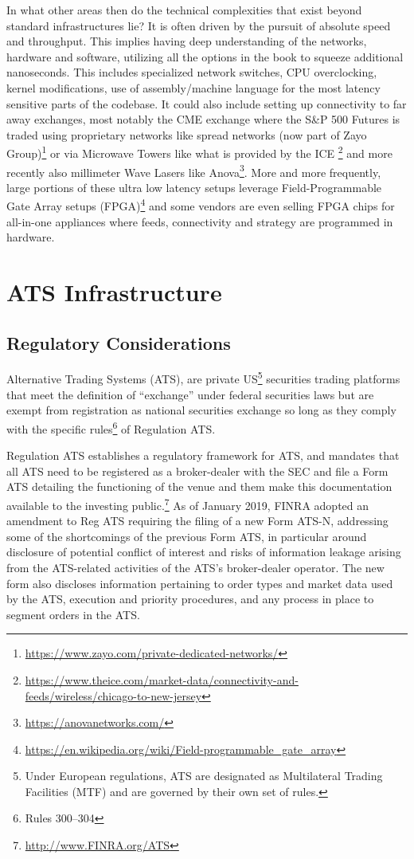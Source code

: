 In what other areas then do the technical complexities that exist beyond standard infrastructures lie? It is often driven by the pursuit of absolute speed and throughput. This implies having deep understanding of the networks, hardware and software, utilizing all the options in the book to squeeze additional nanoseconds. This includes specialized network switches, CPU overclocking, kernel modifications, use of assembly/machine language for the most latency sensitive parts of the codebase. It could also include setting up connectivity to far away exchanges, most notably the CME exchange where the S\&P 500 Futures is traded using proprietary networks like spread networks (now part of Zayo Group)\footnote{\url{https://www.zayo.com/private-dedicated-networks/}} or via Microwave Towers like what is provided by the ICE \footnote{\url{https://www.theice.com/market-data/connectivity-and-feeds/wireless/chicago-to-new-jersey}} and more recently also millimeter Wave Lasers like Anova\footnote{\url{https://anovanetworks.com/}}. More and more frequently, large portions of these ultra low latency setups leverage Field-Programmable Gate Array setups (FPGA)\footnote{\url{https://en.wikipedia.org/wiki/Field-programmable_gate_array}} and some vendors are even selling FPGA chips for all-in-one appliances where feeds, connectivity and strategy are programmed in hardware.



\section{ATS Infrastructure\label{sec:ats_infra}} \label{in:ats}
\subsection{Regulatory Considerations\label{sec:reg_considerations}}

Alternative Trading Systems (ATS), are private US\footnote{Under European regulations, ATS are designated as Multilateral Trading Facilities (MTF) and are governed by their own set of rules.} securities trading platforms that meet the definition of ``exchange'' under federal securities laws but are exempt from registration as national securities exchange so long as they comply with the specific rules\footnote{Rules 300--304} of Regulation ATS.


Regulation ATS establishes a regulatory framework for ATS, and mandates that all ATS need to be registered as a broker-dealer with the SEC and file a Form ATS detailing the functioning of the venue and them make this documentation available to the investing public.\footnote{\url{http://www.FINRA.org/ATS}} As of January 2019, FINRA adopted an amendment to Reg ATS requiring the filing of a new Form ATS-N, addressing some of the shortcomings of the previous Form ATS, in particular around disclosure of potential conflict of interest and risks of information leakage arising from the ATS-related activities of the ATS's broker-dealer operator. The new form also discloses information pertaining to order types and market data used by the ATS, execution and priority procedures, and any process in place to segment orders in the ATS.



